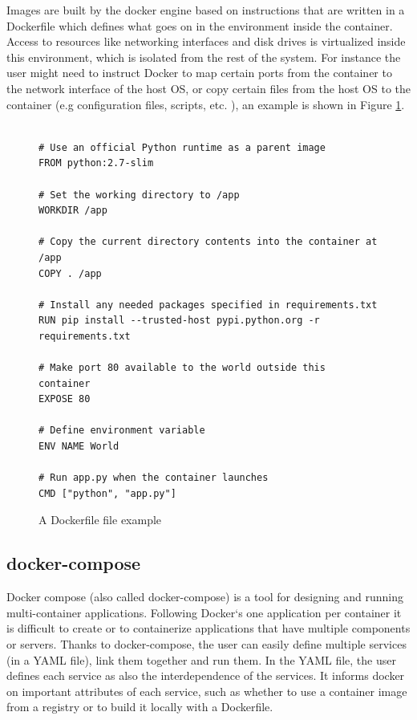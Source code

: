 Images are built by the docker engine based on instructions that are written in a Dockerfile \cite{dockerfile} which defines what goes on in the environment inside the container. Access to resources like networking interfaces and disk drives is virtualized inside this environment, which is isolated from the rest of the system. For instance the user might need to instruct Docker to map certain ports from the container to the network interface of the host OS, or copy certain files from the host OS to the container (e.g configuration files, scripts, etc. ), an example is shown in Figure \ref{fig:dockerfile}.
\bigbreak
\noindent
\begin{figure}
\begin{verbatim}
    
# Use an official Python runtime as a parent image
FROM python:2.7-slim

# Set the working directory to /app
WORKDIR /app

# Copy the current directory contents into the container at /app
COPY . /app

# Install any needed packages specified in requirements.txt
RUN pip install --trusted-host pypi.python.org -r requirements.txt

# Make port 80 available to the world outside this container
EXPOSE 80

# Define environment variable
ENV NAME World

# Run app.py when the container launches
CMD ["python", "app.py"]
\end{verbatim}
\caption{A Dockerfile file example \cite{dockerfile}}
\label{fig:dockerfile}
\end{figure}

\subsection{docker-compose}
Docker compose (also called docker-compose)\cite{docker-compose} is a tool for designing and running multi-container applications. Following Docker‘s one application per container it is difficult to create or to containerize applications that have multiple components or servers. Thanks to docker-compose, the user can easily define multiple services (in a YAML file), link them together and run them. In the YAML file, the user defines each service as also the interdependence of the services. It informs docker on important attributes of each service, such as whether to use a container image from a registry or to build it locally with a Dockerfile. 

